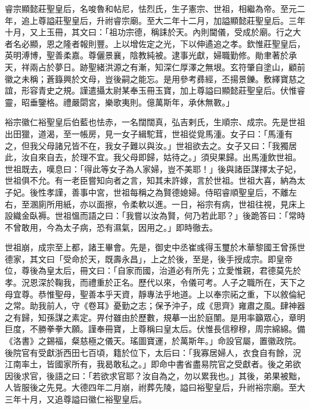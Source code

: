 
\begin{pinyinscope}

 睿宗顯懿莊聖皇后，名唆魯和帖尼，怯烈氏，生子憲宗、世祖，相繼為帝。至元二年，追上尊謚莊聖皇后，升祔睿宗廟。至大二年十二月，加謚顯懿莊聖皇后。三年十月，又上玉冊，其文曰：「祖功宗德，稱誄於天。內則閫儀，受成於廟。行之大者名必顯，恩之隆者報則豐。上以增佐定之光，下以伸遹追之孝。欽惟莊聖皇后，英明溥博，聖善柔嘉。尊儷景襄，陰教純被。逮事光獻，婦職勤修。勛聿著於承天，祥兩占於夢日。跡聖緒洪源之有漸，知深仁厚澤之無垠。玄符肇自塗山，顧前徽之未稱；蒼籙興於文母，豈後嗣之能忘。是用參考彞經，丕揚景鑠。敷繹寶慈之誼，形容青史之規。謹遣攝太尉某奉玉冊玉寶，加上尊謚曰顯懿莊聖皇后。伏惟睿靈，昭垂鑒格。禮嚴閟宮，樂歌夷則。億萬斯年，承休無斁。」



 裕宗徽仁裕聖皇后伯藍也怯赤，一名闊闊真，弘吉剌氏，生順宗、成宗。先是世祖出田獵，道渴，至一帳房，見一女子緝駝茸，世祖從覓馬湩。女子曰：「馬湩有之，但我父母諸兄皆不在，我女子難以與汝。」世祖欲去之。女子又曰：「我獨居此，汝自來自去，於理不宜。我父母即歸，姑待之。」須臾果歸。出馬湩飲世祖。世祖既去，嘆息曰：「得此等女子為人家婦，豈不美耶！」後與諸臣謀擇太子妃，世祖俱不允。有一老臣嘗知向者之言，知其未許嫁，言於世祖。世祖大喜，納為太子妃。後性孝謹，善事中宮，世祖每稱之為賢德媳婦。侍昭睿順聖皇后，不離左右，至溷廁所用紙，亦以面擦，令柔軟以進。一日，裕宗有病，世祖往視，見床上設織金臥褥。世祖慍而語之曰：「我嘗以汝為賢，何乃若此耶？」後跪答曰：「常時不曾敢用，今為太子病，恐有濕氣，因用之。」即時徹去。



 世祖崩，成宗至上都，諸王畢會。先是，御史中丞崔彧得玉璽於木華黎國王曾孫世德家，其文曰「受命於天，既壽永昌」，上之於後，至是，後手授成宗。即皇帝位，尊後為皇太后，冊文曰：「自家而國，治道必有所先；立愛惟親，君德莫先於孝。況恩深於鞠我，而禮重於正名。歷代以來，令儀可考。人子之職所在，天下之母宜尊。恭惟聖母，聖善本乎天資，靜專法乎地道。上以奉宗祏之重，下以敘倫紀之常。助我前人，守《卷耳》憂勤之志；保予沖子，成《思齊》雍肅之風。肆神器之有歸，知孫謀之素定。畀付雖由於歷數，規摹一出於庭闈。是用率籲眾心，章明巨度，不勝拳拳大願。謹奉冊寶，上尊稱曰皇太后。伏惟長信穆穆，周宗綿綿。備《洛書》之錫福，粲慈極之儀天。瑤圖寶運，於萬斯年。」命設官屬，置徽政院。後院官有受獻浙西田七百頃，籍於位下，太后曰：「我寡居婦人，衣食自有餘，況江南率土，皆國家所有，我曷敢私之。」即命中書省盡易院官之受獻者。後之弟欲因後求官，後語之曰：「若欲求官耶？汝自為之，勿以累我也。」其後，弟果被黜，人皆服後之先見。大德四年二月崩，祔葬先陵，謚曰裕聖皇后，升祔裕宗廟。至大三年十月，又追尊謚曰徽仁裕聖皇后。




\end{pinyinscope}
